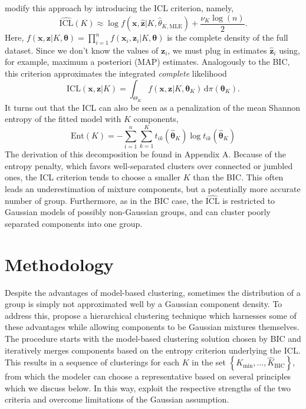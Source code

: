 \documentclass{uwstat572}
\newcommand*\set[1]{\left\{#1\right\}}
\newcommand*\estim[1]{\widehat{#1}}
\newcommand*\der{\text{d}}
\newcommand*\bx{\mathbf{x}}
\newcommand*\bz{\mathbf{z}}
\newcommand*\btheta{\boldsymbol{\theta}}
\renewcommand\;{\,}
\begin{document}
\citet{Biernacki00} modify this approach by introducing the ICL criterion, namely,
\begin{equation}
\estim{\text{ICL}}(K)
	\approx 
	\log f \left(\bx, \estim\bz | K, \estim\theta_{K, \text{MLE}}\right)
		 + \frac{ \nu_K \log(n) }{2}.
\end{equation}
Here, $f(\bx, \bz | K, \btheta) = \prod_{i=1}^n f(\bx_i, \bz_i | K, \btheta)$ is the complete density of the full dataset.
Since we don't know the values of $\bz_i$, we must plug in estimates $\estim\bz_i$ using, for example, maximum a posteriori (MAP) estimates.
Analogously to the BIC, this criterion approximates the integrated \emph{complete} likelihood
\begin{equation}
\text{ICL}(\bx, \bz | K)
	 = \int_{\Theta_K} f(\bx, \bz | K, \btheta_K) \; \der \pi(\btheta_K).
\end{equation}
It turns out that the ICL can also be seen as a penalization of the mean Shannon entropy of the fitted model with $K$ components, 
\begin{equation}
\text{Ent}(K)
	 = - \sum_{i=1}^n \sum_{k = 1}^K t_{ik}\left(\estim\btheta_K \right) 
	 	\log t_{ik}\left(\estim\btheta_K \right)
\end{equation}
The derivation of this decomposition be found in Appendix A.
Because of the entropy penalty, which favors well-separated clusters over connected or jumbled ones, the ICL criterion tends to choose a smaller $K$ than the BIC.
This often leads an underestimation of mixture components, but a potentially more accurate number of group.
Furthermore, as in the BIC case, the $\estim{\text{ICL}}$ is restricted to Gaussian models of possibly non-Gaussian groups, and can cluster poorly separated components into one group.


\section{Methodology}
Despite the advantages of model-based clustering, sometimes the distribution of a group is simply not approximated well by a Gaussian component density.
To address this, \cite{Baudry10} propose a hierarchical clustering technique which harnesses some of these advantages while allowing components to be Gaussian mixtures themselves. 
The procedure starts with the model-based clustering solution chosen by BIC and iteratively merges components based on the entropy criterion underlying the ICL.
This results in a sequence of clusterings for each $K$ in the set $\set{K_\text{min}, \dotsc, \estim K_\text{BIC}}$, from which the modeler can choose a representative based on several principles which we discuss below.
In this way, \cite{Baudry10} exploit the respective strengths of the two criteria and overcome limitations of the Gaussian assumption.
\end{document}
